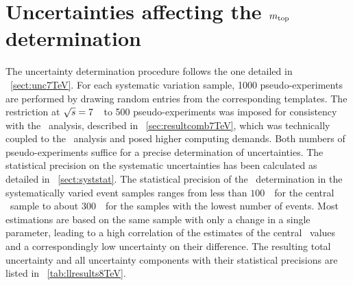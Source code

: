 \section[Uncertainties affecting the \mt\ determination]{Uncertainties affecting the \boldmath$m_{\mathrm{top}}$ determination}
\label{sect:unc8TeV}
%
The uncertainty determination procedure follows the one detailed in \sect~\ref{sect:unc7TeV}. For each systematic variation sample, 1000 pseudo-experiments are performed by drawing random entries from the corresponding templates. The restriction at ${\sqrt{s}}=7$~\TeV\ to 500 pseudo-experiments was imposed for consistency with the \ttbarlj\ analysis, described in \sect~\ref{sec:resultcomb7TeV}, which was technically coupled to the \ttbarll\ analysis and posed higher computing demands. Both numbers of pseudo-experiments suffice for a precise determination of uncertainties. The statistical precision on the systematic uncertainties has been calculated as detailed in \sect~\ref{sect:syststat}. 
%
The statistical precision of the \mt\ determination in the systematically varied event samples ranges from less than $100$~\MeV\ for the central \ttbar\ sample to about $300$~\MeV\ for the samples with the lowest number of events.
%
Most estimations are based on the same sample with only a change in a single parameter, leading to a high correlation of the estimates of the central \mt\ values and a correspondingly low uncertainty on their difference. 
%
The resulting total uncertainty and all uncertainty components with their statistical precisions are listed in \tab~\ref{tab:llresults8TeV}.
%

